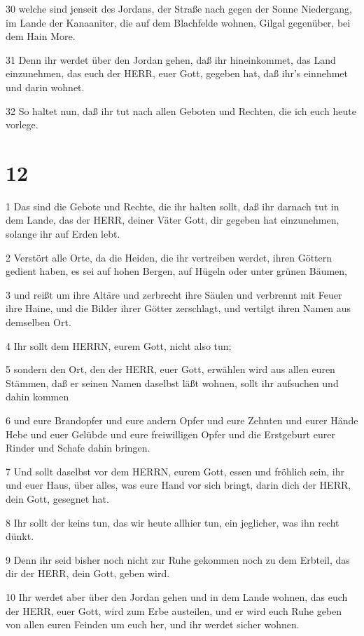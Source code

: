\par 30 welche sind jenseit des Jordans, der Straße nach gegen der Sonne Niedergang, im Lande der Kanaaniter, die auf dem Blachfelde wohnen, Gilgal gegenüber, bei dem Hain More.
\par 31 Denn ihr werdet über den Jordan gehen, daß ihr hineinkommet, das Land einzunehmen, das euch der HERR, euer Gott, gegeben hat, daß ihr's einnehmet und darin wohnet.
\par 32 So haltet nun, daß ihr tut nach allen Geboten und Rechten, die ich euch heute vorlege.

\chapter{12}

\par 1 Das sind die Gebote und Rechte, die ihr halten sollt, daß ihr darnach tut in dem Lande, das der HERR, deiner Väter Gott, dir gegeben hat einzunehmen, solange ihr auf Erden lebt.
\par 2 Verstört alle Orte, da die Heiden, die ihr vertreiben werdet, ihren Göttern gedient haben, es sei auf hohen Bergen, auf Hügeln oder unter grünen Bäumen,
\par 3 und reißt um ihre Altäre und zerbrecht ihre Säulen und verbrennt mit Feuer ihre Haine, und die Bilder ihrer Götter zerschlagt, und vertilgt ihren Namen aus demselben Ort.
\par 4 Ihr sollt dem HERRN, eurem Gott, nicht also tun;
\par 5 sondern den Ort, den der HERR, euer Gott, erwählen wird aus allen euren Stämmen, daß er seinen Namen daselbst läßt wohnen, sollt ihr aufsuchen und dahin kommen
\par 6 und eure Brandopfer und eure andern Opfer und eure Zehnten und eurer Hände Hebe und euer Gelübde und eure freiwilligen Opfer und die Erstgeburt eurer Rinder und Schafe dahin bringen.
\par 7 Und sollt daselbst vor dem HERRN, eurem Gott, essen und fröhlich sein, ihr und euer Haus, über alles, was eure Hand vor sich bringt, darin dich der HERR, dein Gott, gesegnet hat.
\par 8 Ihr sollt der keins tun, das wir heute allhier tun, ein jeglicher, was ihn recht dünkt.
\par 9 Denn ihr seid bisher noch nicht zur Ruhe gekommen noch zu dem Erbteil, das dir der HERR, dein Gott, geben wird.
\par 10 Ihr werdet aber über den Jordan gehen und in dem Lande wohnen, das euch der HERR, euer Gott, wird zum Erbe austeilen, und er wird euch Ruhe geben von allen euren Feinden um euch her, und ihr werdet sicher wohnen.
